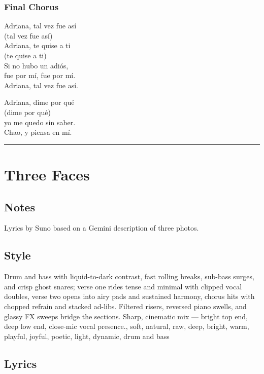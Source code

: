\subsubsection{Final Chorus}\label{final-chorus-4}

Adriana, tal vez fue así\\
(tal vez fue así)\\
Adriana, te quise a ti\\
(te quise a ti)\\
Si no hubo un adiós,\\
fue por mí, fue por mí.\\
Adriana, tal vez fue así.

Adriana, dime por qué\\
(dime por qué)\\
yo me quedo sin saber.\\
Chao, y piensa en mí.

\begin{center}\rule{0.5\linewidth}{0.5pt}\end{center}

\section{Three Faces}\label{three-faces}

\subsection{Notes}\label{notes-21}

Lyrics by Suno based on a Gemini description of three photos.

\subsection{Style}\label{style-21}

Drum and bass with liquid-to-dark contrast, fast rolling breaks,
sub-bass surges, and crisp ghost snares; verse one rides tense and
minimal with clipped vocal doubles, verse two opens into airy pads and
sustained harmony, chorus hits with chopped refrain and stacked ad-libs.
Filtered risers, reversed piano swells, and glassy FX sweeps bridge the
sections. Sharp, cinematic mix --- bright top end, deep low end,
close-mic vocal presence., soft, natural, raw, deep, bright, warm,
playful, joyful, poetic, light, dynamic, drum and bass

\subsection{Lyrics}\label{lyrics-21}

